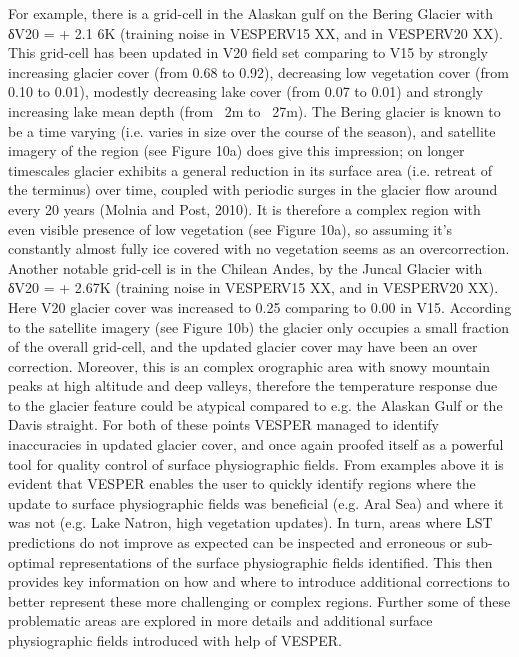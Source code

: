 \documentclass[hess, manuscript]{copernicus}
\begin{document}
For  example,  there  is  a  grid-cell  in  the  Alaskan  gulf  on  the  Bering  Glacier  with  δV20 = + 2.1 6K  (training  noise  in VESPERV15 XX, and in VESPERV20 XX). This grid-cell has been updated in V20 field set comparing to V15 by strongly increasing glacier cover (from 0.68 to 0.92), decreasing low vegetation cover (from 0.10 to 0.01), modestly decreasing lake cover (from 0.07 to 0.01) and strongly increasing lake mean depth (from ~2m to ~27m). The Bering glacier is known to be a time varying (i.e. varies in size over the course of the season), and satellite imagery of the region (see Figure 10a) does give this impression; on longer timescales glacier exhibits a general reduction in its surface area (i.e. retreat of the terminus) over time, coupled with periodic surges in the glacier flow around every 20 years (Molnia and Post, 2010). It is therefore a complex region with even visible presence of low vegetation (see Figure 10a), so assuming it’s constantly almost fully ice covered with no vegetation  seems  as  an  overcorrection.  Another  notable  grid-cell  is  in  the  Chilean  Andes,  by  the  Juncal  Glacier  with δV20 = + 2.67K (training noise in VESPERV15 XX, and in VESPERV20 XX). Here V20 glacier cover was increased to 0.25 comparing to 0.00 in V15. According to the satellite imagery (see Figure 10b) the glacier only occupies a small fraction of the overall grid-cell, and the updated glacier cover may have been an over correction. Moreover, this is an complex orographic area with snowy mountain peaks at high altitude and deep valleys, therefore the temperature response due to the glacier feature could  be  atypical  compared  to  e.g.  the  Alaskan  Gulf  or  the  Davis  straight.  For  both  of  these  points  VESPER  managed  to identify inaccuracies in updated glacier cover, and once again proofed itself as a powerful tool for quality control of surface physiographic fields. From  examples  above  it  is  evident  that  VESPER  enables  the  user  to  quickly  identify  regions  where  the  update  to  surface physiographic fields was beneficial (e.g. Aral Sea) and where it was not (e.g. Lake Natron, high vegetation updates). In turn, areas where LST predictions do not improve as expected can be inspected and erroneous or sub-optimal representations of the surface  physiographic  fields  identified.  This  then  provides  key  information  on  how  and  where  to  introduce  additional corrections to better represent these more challenging or complex regions. Further some of these problematic areas are explored in more details and additional surface physiographic fields introduced with help of VESPER.
\end{document}
